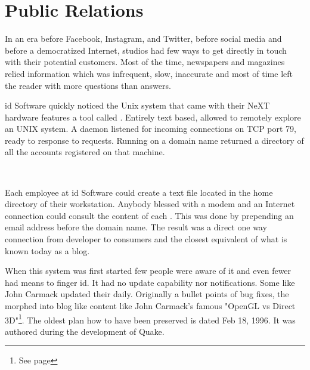 \section{Public Relations}
In an era before Facebook, Instagram, and Twitter, before social media and before a democratized Internet, studios had few ways to get directly in touch with their potential customers. Most of the time, newspapers and magazines relied information which was infrequent, slow, inaccurate and most of time left the reader with more questions than answers.


id Software quickly noticed the Unix system that came with their NeXT hardware features a tool called . Entirely text based,  allowed to remotely explore an UNIX system. A  daemon listened for incoming connections on TCP port 79, ready to response to requests. Running  on a domain name returned a directory of all the accounts registered on that machine.\\
\par
{}
\par
{}\\
\par

Each employee at id Software could create a  text file located in the home directory of their \NeXT workstation. Anybody blessed with a modem and an Internet connection could consult the content of each . This was done by prepending an email address before the domain name. The result was a direct one way connection from developer to consumers and the closest equivalent of what is known today as a blog.\\
\par
When this system was first started few people were aware of it and even fewer had means to finger id. It had no update capability nor notifications. Some like John Carmack updated their  daily. Originally a bullet points of bug fixes, the  morphed into blog like content like John Carmack's famous "OpenGL vs Direct 3D"\footnote{See page \pageref{openglvsdirectd}}. The oldest plan how to have been preserved is dated Feb 18, 1996. It was authored during the development of Quake.



